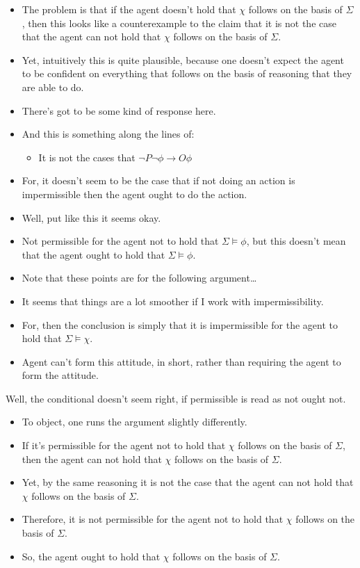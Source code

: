 \documentclass[10pt]{article}
\begin{document}
\begin{itemize}
\item The problem is that if the agent doesn't hold that \(\chi\) follows on the basis of \(\Sigma\), then this looks like a counterexample to the claim that it is not the case that the agent can not hold that \(\chi\) follows on the basis of \(\Sigma\).
\item Yet, intuitively this is quite plausible, because one doesn't expect the agent to be confident on everything that follows on the basis of reasoning that they are able to do.
\end{itemize}

\begin{itemize}
\item There's got to be some kind of response here.
\item And this is something along the lines of:
  \begin{itemize}
  \item It is not the cases that \(\lnot P \lnot\phi \rightarrow O \phi\)
  \end{itemize}
\item For, it doesn't seem to be the case that if not doing an action is impermissible then the agent ought to do the action.
\item Well, put like this it seems okay.
\item Not permissible for the agent not to hold that \(\Sigma \vDash \phi\), but this doesn't mean that the agent ought to hold that \(\Sigma \vDash \phi\).
\item {\color{red} Note that these points are for the following argument\dots}
\item It seems that things are a lot smoother if I work with impermissibility.
\item For, then the conclusion is simply that it is impermissible for the agent to hold that \(\Sigma \vDash \chi\).
\item Agent can't form this attitude, in short, rather than requiring the agent to form the attitude.
\end{itemize}

{
  \color{red}
  Well, the conditional doesn't seem right, if permissible is read as not ought not.
}

\begin{itemize}
\item To object, one runs the argument slightly differently.
\item If it's permissible for the agent not to hold that \(\chi\) follows on the basis of \(\Sigma\), then the agent can not hold that \(\chi\) follows on the basis of \(\Sigma\).
\item Yet, by the same reasoning it is not the case that the agent can not hold that \(\chi\) follows on the basis of \(\Sigma\).
\item Therefore, it is not permissible for the agent not to hold that \(\chi\) follows on the basis of \(\Sigma\).
\item So, the agent ought to hold that \(\chi\) follows on the basis of \(\Sigma\).
\end{itemize}
\end{document}
